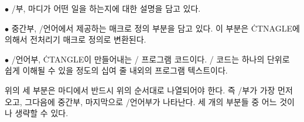 \yskip\item{$\bullet$} \TEX/부, 마디가 어떤 일을 하는지에 대한 설명을 담고 있다.

\item{$\bullet$} 중간부, \CEE/언어에서 제공하는 매크로 정의 부분을 담고
있다. 이 부분은 \.{CTNAGLE}에 의해서 전처리기 매크로 정의로 변환된다.

\item{$\bullet$} \CEE/언어부, \.{CTANGLE}이 만들어내는 \CEE/ 프로그램
코드이다. \CEE/ 코드는 하나의 단위로 쉽게 이해될 수 있을 정도의 십여 줄
내외의 프로그램 텍스트이다. 

\yskip\noindent 위의 세 부분은 마디에서 반드시 위의 순서대로 나열되어야 한다. 
즉 \TEX/부가 가장 먼저 오고, 그다음에 중간부, 마지막으로 \CEE/언어부가
나타난다. 세 개의 부분들 중 어느 것이나 생략할 수 있다.

